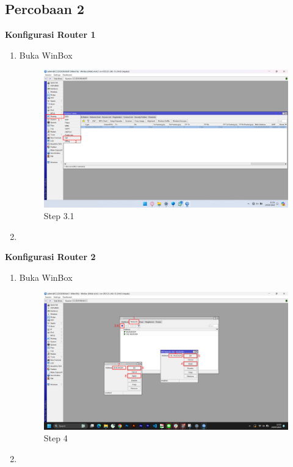 \subsection{Percobaan 2}
\begin{center}
    \textbf{Konfigurasi Router 1}
    \begin{enumerate}
        \item Buka WinBox
        \begin{figure}[H]
			\centering
			\includegraphics[width=0.8\linewidth]{P3/img/per2/pc1/Step 3.1.png}
			\caption{Step 3.1}
			\label{fig:Step 3.1(Per.2 PC1)}
		\end{figure}
        \item 
    \end{enumerate}

    \textbf{Konfigurasi Router 2}
    \begin{enumerate}
        \item Buka WinBox
        \begin{figure}[H]
			\centering
			\includegraphics[width=0.8\linewidth]{P3/img/per2/pc2/Step 4.png}
			\caption{Step 4}
			\label{fig:Step 4(Per.2 PC2)}
		\end{figure}
        \item 
    \end{enumerate}


\end{center}
